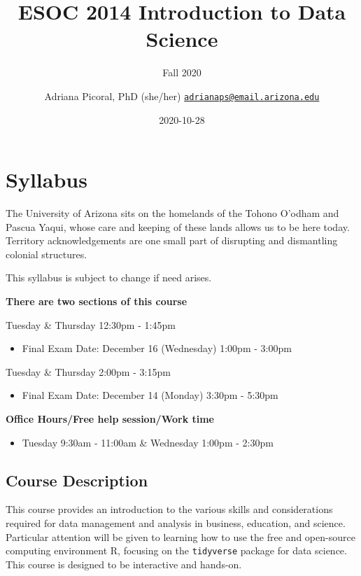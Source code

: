 \documentclass[
]{book}
\title{ESOC 2014 Introduction to Data Science}
\subtitle{Fall 2020}
\author{Adriana Picoral, PhD (she/her) \href{mailto:adrianaps@email.arizona.edu}{\nolinkurl{adrianaps@email.arizona.edu}}}
\date{2020-10-28}
\providecommand{\tightlist}{%
  \setlength{\itemsep}{0pt}\setlength{\parskip}{0pt}}
\begin{document}
\maketitle

{
\setcounter{tocdepth}{1}
\tableofcontents
}
\hypertarget{syllabus}{%
\chapter{Syllabus}\label{syllabus}}

The University of Arizona sits on the homelands of the Tohono O'odham and Pascua Yaqui, whose care and keeping of these lands allows us to be here today. Territory acknowledgements are one small part of disrupting and dismantling colonial structures.

This syllabus is subject to change if need arises.

\textbf{There are two sections of this course}

Tuesday \& Thursday 12:30pm - 1:45pm

\begin{itemize}
\tightlist
\item
  Final Exam Date: December 16 (Wednesday) 1:00pm - 3:00pm
\end{itemize}

Tuesday \& Thursday 2:00pm - 3:15pm

\begin{itemize}
\tightlist
\item
  Final Exam Date: December 14 (Monday) 3:30pm - 5:30pm
\end{itemize}

\textbf{Office Hours/Free help session/Work time}

\begin{itemize}
\tightlist
\item
  Tuesday 9:30am - 11:00am \& Wednesday 1:00pm - 2:30pm
\end{itemize}

\hypertarget{course-description}{%
\section{Course Description}\label{course-description}}

This course provides an introduction to the various skills and considerations required for data management and analysis in business, education, and science. Particular attention will be given to learning how to use the free and open-source computing environment R, focusing on the \texttt{tidyverse} package for data science. This course is designed to be interactive and hands-on.
\end{document}
